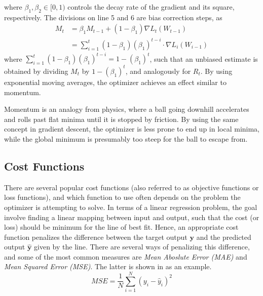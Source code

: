         where $\beta_1,\beta_2\in [0,1)$ controls the decay rate of the gradient and its square, respectively. The divisions on line 5 and 6 are bias correction steps, as
        \begin{equation}
            \begin{split}
                M_t &= \beta_1 M_{t-1}+(1-\beta_1)\nabla L_t(W_{t-1}) \\
                &= \sum_{i=1}^t (1-\beta_1)(\beta_1)^{t-i} \cdot \nabla L_i(W_{i-1})
            \end{split}
        \end{equation}
        where $\sum_{i=1}^t(1-\beta_1)(\beta_1)^{t-i} = 1-(\beta_1)^t$, such that an unbiased estimate is obtained by dividing $M_t$ by $1-(\beta_1)^t$, and analogously for $R_t$.
        By using exponential moving averages, the optimizer achieves an effect similar to momentum.
        
        
        Momentum is an analogy from physics, where a ball going downhill accelerates and rolls past flat minima until it is stopped by friction. By using the same concept in gradient descent, the optimizer is less prone to end up in local minima, while the global minimum is presumably too steep for the ball to escape from.

    \subsection{Cost Functions}
    
        There are several popular cost functions (also referred to as objective functions or loss functions), and which function to use often depends on the problem the optimizer is attempting to solve. 
        In terms of a linear regression problem, the goal involve finding a linear mapping between input and output, such that the cost (or loss) should be minimum for the line of best fit. Hence, an appropriate cost function penalizes the difference between the target output $\bm{y}$ and the predicted output $\bm{\hat{y}}$ given by the line. 
        There are several ways of penalizing this difference, and some of the most common measures are \emph{Mean Aboslute Error (MAE)} and \emph{Mean Squared Error (MSE)}. The latter is shown in  as an example.
        \begin{equation}\label{eq:mopt-mseloss}
            MSE = \frac{1}{N}\sum_{i=1}^N(y_i-\hat{y}_i)^2
        \end{equation}
        
